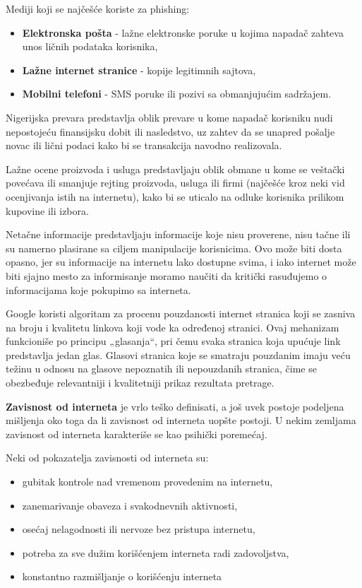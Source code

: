 \documentclass[a4paper, 12pt]{article}
\begin{document}
Mediji koji se najčešće koriste za phishing:
\begin{itemize}
    \item \textbf{Elektronska pošta} - lažne elektronske poruke u kojima napadač zahteva unos ličnih podataka korisnika,
    \item \textbf{Lažne internet stranice} - kopije legitimnih sajtova,
    \item \textbf{Mobilni telefoni} - SMS poruke ili pozivi sa obmanjujućim sadržajem.
\end{itemize}

Nigerijska prevara predstavlja oblik prevare u kome napadač korisniku nudi
nepostojeću finansijsku dobit ili nasledstvo, uz zahtev da se unapred pošalje novac
ili lični podaci kako bi se transakcija navodno realizovala.

Lažne ocene proizvoda i usluga predstavljaju oblik obmane u kome se veštački
povećava ili smanjuje rejting proizvoda, usluga ili firmi (najčešće kroz neki vid ocenjivanja istih na internetu), kako bi se uticalo na odluke korisnika prilikom kupovine ili izbora.

Netačne informacije predstavljaju informacije koje nisu proverene, nisu tačne ili
su namerno plasirane sa ciljem manipulacije korisnicima. Ovo može biti dosta opasno, jer su informacije na internetu lako dostupne svima, i iako internet može biti sjajno mesto za informisanje moramo naučiti da kritički rasuđujemo o informacijama koje pokupimo sa interneta.

Google koristi algoritam za procenu pouzdanosti internet stranica koji se zasniva na broju i kvalitetu linkova koji vode ka određenoj stranici. Ovaj mehanizam funkcioniše po principu „glasanja“, pri čemu svaka stranica koja upućuje link predstavlja jedan glas. Glasovi stranica koje se smatraju pouzdanim imaju veću težinu u odnosu na glasove nepoznatih ili nepouzdanih stranica, čime se obezbeđuje relevantniji i kvalitetniji prikaz rezultata pretrage.

\vspace{\baselineskip}

\textbf{Zavisnost od interneta} je vrlo teško definisati, a još uvek postoje podeljena mišljenja oko toga da li zavisnost od interneta uopšte postoji.
U nekim zemljama zavisnost od interneta karakteriše se kao psihički poremećaj.

Neki od pokazatelja zavisnosti od interneta su:
\begin{itemize}
    \item gubitak kontrole nad vremenom provedenim na internetu,
    \item zanemarivanje obaveza i svakodnevnih aktivnosti,
    \item osećaj nelagodnosti ili nervoze bez pristupa internetu,
    \item potreba za sve dužim korišćenjem interneta radi zadovoljstva,
    \item konstantno razmišljanje o korišćenju interneta
\end{itemize}
\end{document}
